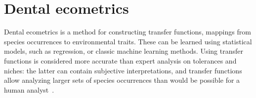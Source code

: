 \documentclass[english,twoside,openright]{UH_DS_MSc}
\begin{document}
\section{Dental ecometrics}
\label{sect:ecometrics}

Dental ecometrics is a method for constructing transfer functions, mappings from species occurrences to environmental traits.
These can be learned using statistical models, such as regression, or classic machine learning methods.
Using transfer functions is considered more accurate than expert analysis on tolerances and niches: the latter
can contain subjective interpretations, and transfer functions allow analyzing larger sets of species occurrences than would 
 be possible for a human analyst~\cite{Faith_Lyman_2019_ch9}.
\end{document}
